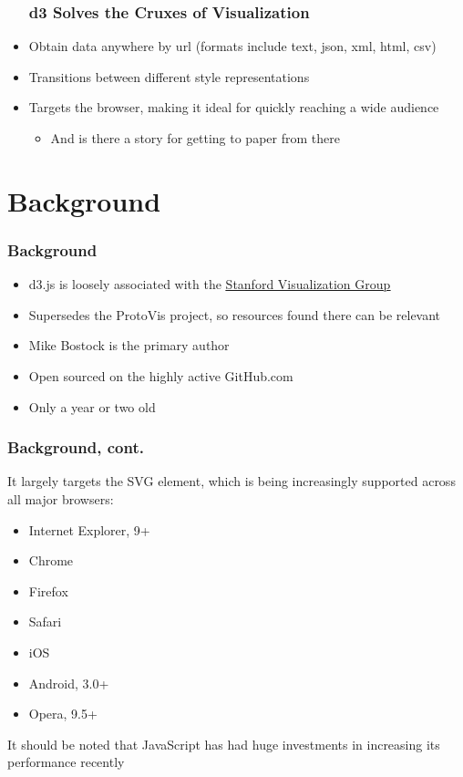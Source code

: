 \documentclass{beamer}
\begin{document}
\begin{frame}
\begin{itemize}
\frametitle{d3 Solves the Cruxes of Visualization}
\item Obtain data anywhere by url (formats include text, json, xml, html, csv)
\pause
\item Transitions between different style representations
\pause
\item Targets the browser, making it ideal for quickly reaching a wide audience
    \begin{itemize}
    \item And is there a story for getting to paper from there
    \end{itemize}
\end{itemize}
\end{frame}



\section{Background}


\begin{frame}
\frametitle{Background}
\begin{itemize}
\item d3.js is loosely associated with the \href{http://vis.stanford.edu/}{\underline{Stanford Visualization Group}}
\pause
\item Supersedes the ProtoVis project, so resources found there can be relevant
\pause
\item Mike Bostock is the primary author
\item Open sourced on the highly active GitHub.com
\item Only a year or two old
\end{itemize}
\end{frame}


\begin{frame}
\frametitle{Background, cont.}
It largely targets the SVG element, which is being increasingly supported across all major browsers:
\pause
    \begin{itemize}
    \item Internet Explorer, 9+
    \item Chrome
    \item Firefox
    \item Safari
    \item iOS
    \item Android, 3.0+
    \item Opera, 9.5+
    \end{itemize}
\pause
It should be noted that JavaScript has had huge investments in increasing its performance recently
\end{frame}
\end{document}
